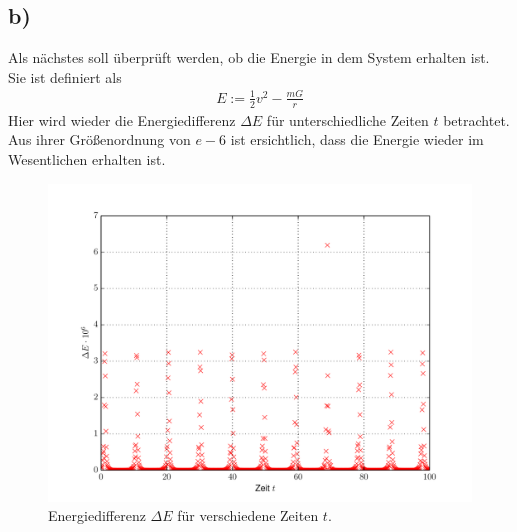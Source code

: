 \subsection*{b)}
Als nächstes soll überprüft werden, ob die Energie in dem System erhalten ist.
Sie ist definiert als
\begin{align}
	E:=\frac{1}{2}v^2-\frac{mG}{r}
\end{align}
Hier wird wieder die Energiedifferenz $\Delta E$ für unterschiedliche Zeiten $t$ betrachtet.
Aus ihrer Größenordnung von $e-6$ ist ersichtlich, dass die Energie wieder im Wesentlichen erhalten ist.
\begin{figure}[H]
	\centering
	\includegraphics[width = \textwidth]{../Plots/Plot_4_Energie.pdf}
	\caption{Energiedifferenz $\Delta E$ für verschiedene Zeiten $t$.\label{fig:Energie}}
\end{figure}

